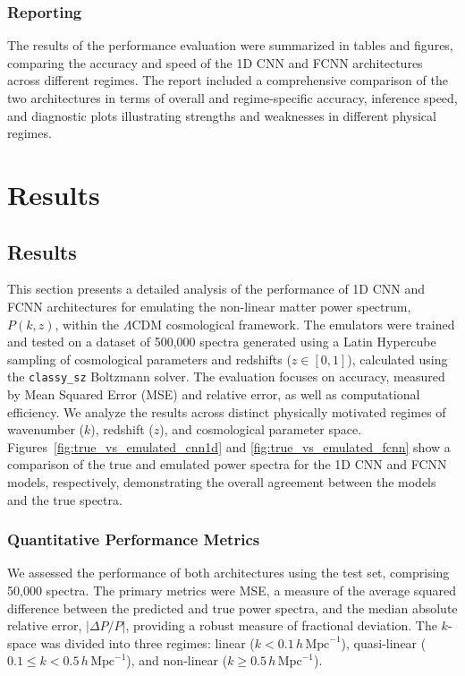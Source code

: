 \documentclass[twocolumn]{aastex631}
\begin{document}
\subsubsection{Reporting}

The results of the performance evaluation were summarized in tables and figures, comparing the accuracy and speed of the 1D CNN and FCNN architectures across different regimes. The report included a comprehensive comparison of the two architectures in terms of overall and regime-specific accuracy, inference speed, and diagnostic plots illustrating strengths and weaknesses in different physical regimes.

\section{Results}
\label{sec:results}
\subsection{Results}

This section presents a detailed analysis of the performance of 1D CNN and FCNN architectures for emulating the non-linear matter power spectrum, $P(k, z)$, within the $\Lambda$CDM cosmological framework. The emulators were trained and tested on a dataset of 500,000 spectra generated using a Latin Hypercube sampling of cosmological parameters and redshifts ($z \in [0, 1]$), calculated using the \texttt{classy\_sz} Boltzmann solver. The evaluation focuses on accuracy, measured by Mean Squared Error (MSE) and relative error, as well as computational efficiency. We analyze the results across distinct physically motivated regimes of wavenumber ($k$), redshift ($z$), and cosmological parameter space. Figures~\ref{fig:true_vs_emulated_cnn1d} and \ref{fig:true_vs_emulated_fcnn} show a comparison of the true and emulated power spectra for the 1D CNN and FCNN models, respectively, demonstrating the overall agreement between the models and the true spectra.

\subsubsection{Quantitative Performance Metrics}

We assessed the performance of both architectures using the test set, comprising 50,000 spectra. The primary metrics were MSE, a measure of the average squared difference between the predicted and true power spectra, and the median absolute relative error, $|\Delta P/P|$, providing a robust measure of fractional deviation. The $k$-space was divided into three regimes: linear ($k < 0.1\,h\,\mathrm{Mpc}^{-1}$), quasi-linear ($0.1 \leq k < 0.5\,h\,\mathrm{Mpc}^{-1}$), and non-linear ($k \geq 0.5\,h\,\mathrm{Mpc}^{-1}$).
\end{document}
